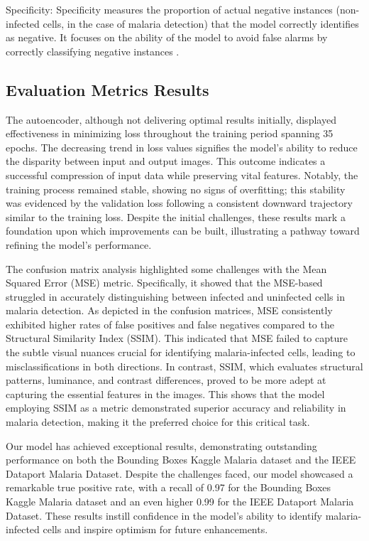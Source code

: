 \documentclass[journal,12pt,onecolumn,draftcls]{IEEEtran}
\begin{document}
Specificity: Specificity measures the proportion of actual negative instances (non-infected cells, in the case of malaria detection) that the model correctly identifies as negative. It focuses on the ability of the model to avoid false alarms by correctly classifying negative instances \cite{powers2011}.

\subsection{Evaluation Metrics Results}
The autoencoder, although not delivering optimal results initially, displayed effectiveness in minimizing loss throughout the training period spanning 35 epochs. The decreasing trend in loss values signifies the model's ability to reduce the disparity between input and output images. This outcome indicates a successful compression of input data while preserving vital features. Notably, the training process remained stable, showing no signs of overfitting; this stability was evidenced by the validation loss following a consistent downward trajectory similar to the training loss. Despite the initial challenges, these results mark a foundation upon which improvements can be built, illustrating a pathway toward refining the model's performance.

The confusion matrix analysis highlighted some challenges with the Mean Squared Error (MSE) metric. Specifically, it showed that the MSE-based struggled in accurately distinguishing between infected and uninfected cells in malaria detection. As depicted in the confusion matrices, MSE consistently exhibited higher rates of false positives and false negatives compared to the Structural Similarity Index (SSIM). This indicated that MSE failed to capture the subtle visual nuances crucial for identifying malaria-infected cells, leading to misclassifications in both directions. In contrast, SSIM, which evaluates structural patterns, luminance, and contrast differences, proved to be more adept at capturing the essential features in the images. This shows that the model employing SSIM as a metric demonstrated superior accuracy and reliability in malaria detection, making it the preferred choice for this critical task.

Our model has achieved exceptional results, demonstrating outstanding performance on both the Bounding Boxes Kaggle Malaria dataset and the IEEE Dataport Malaria Dataset. Despite the challenges faced, our model showcased a remarkable true positive rate, with a recall of 0.97 for the Bounding Boxes Kaggle Malaria dataset and an even higher 0.99 for the IEEE Dataport Malaria Dataset. These results instill confidence in the model's ability to identify malaria-infected cells and inspire optimism for future enhancements.
\end{document}
